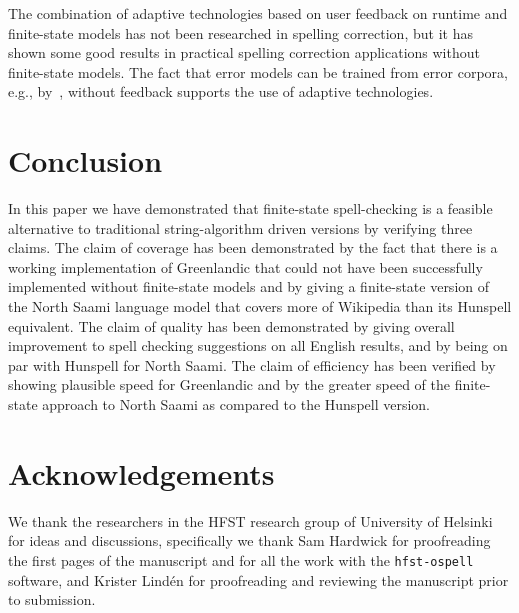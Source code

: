 \documentclass[a4paper,12pt]{article}
\begin{document}
The combination of adaptive technologies based on user feedback on runtime and
finite-state models has not been researched in spelling correction, but it has
shown some good results in practical spelling correction applications without
finite-state models. The fact that error models can be trained from error
corpora,  e.g., by~\cite{church1991probability}, without feedback supports the
use of adaptive technologies.

\section{Conclusion}
\label{sec:conclusion}

In this paper we have demonstrated that finite-state spell-checking is a
feasible alternative to traditional string-algorithm driven versions by
verifying three claims. The claim of coverage has been demonstrated by the fact
that there is a working implementation of Greenlandic that could not have been
successfully implemented without finite-state models and by giving a
finite-state version of the North Saami language model that covers more of
Wikipedia than its Hunspell equivalent. The claim of quality has been
demonstrated by giving overall improvement to spell checking suggestions on all
English results, and by being on par with Hunspell for North Saami. The claim
of efficiency has been verified by showing  plausible speed for Greenlandic and
by the greater speed of the finite-state approach to North Saami as compared to
the Hunspell version.

\section*{Acknowledgements}

We thank the researchers in the HFST research group of University of Helsinki
for ideas and discussions, specifically we thank Sam Hardwick for proofreading
the first pages of the manuscript and for all the work with the 
\texttt{hfst-ospell} software, and Krister Lindén for proofreading and 
reviewing the manuscript prior to submission.


\end{document}

